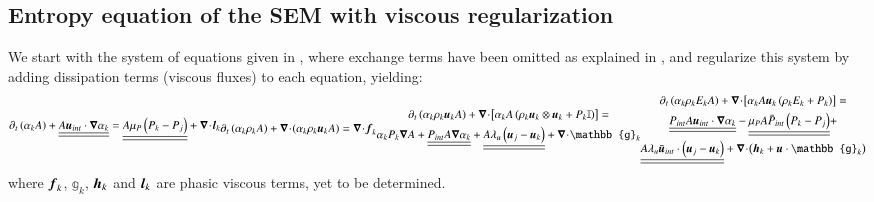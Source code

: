 \documentclass[preprint,10pt]{elsarticle}
\begin{document}
\subsection{Entropy equation of the SEM with viscous regularization}
%
We start with the system of equations given in , where exchange terms have been omitted as explained in ,
and regularize this system by adding dissipation terms (viscous fluxes) to each equation, yielding:
%
\begin{subequations}\label{eq:sev_equ-with-diss-terms}
\begin{align}\label{eq:sev_equ-with-diss-terms-vf}
\partial_t \left( \alpha_k  A\right) + \underline{\underline{A \mbold u_{int} \cdot \grad \alpha_k}} = \underline{\underline{A \mu_P \left( P_k - P_j \right)}} + \div \mbold l_k 
\end{align}
\begin{align}\label{eq:sev_equ-with-diss-terms-cont}
\partial_t \left( \alpha_k \rho_k A \right) + \div \left( \alpha_k \rho_k \mbold u_k A \right) = \div \mbold f_k
\end{align}
%
\begin{multline}\label{eq:sev_equ-with-diss-terms-mom}
\partial_t \left( \alpha_k \rho_k \mbold u_k A \right) + \div \left[ \alpha_k A \left( \rho_k \mbold u_k \otimes \mbold u_k + P_k \mathbb{I} \right) \right] =\\
\alpha_k P_k \grad A + \underline{\underline{P_{int} A \grad \alpha_k}} + \underline{\underline{A \lambda_u \left( \mbold u_j - \mbold u_k \right)}} + \div \mathbb{g}_k
\end{multline}
%
\begin{multline}\label{eq:sev_equ-with-diss-terms-ener}
\partial_t \left( \alpha_k \rho_k E_k A \right) + \div \left[ \alpha_k A \mbold u_k \left( \rho_k E_k + P_k \right) \right] = \\
\underline{\underline{P_{int} A \mbold u_{int} \cdot \grad \alpha_k}} -
\underline{\underline{\mu_P A  \bar{P}_{int} \left( P_k-P_j \right)}} + \\
\underline{\underline{A \lambda_u \bar{\mbold u}_{int} \cdot \left( \mbold u_j - \mbold u_k \right)}}
+ \div \left( \mbold h_k + \mbold u \cdot \mathbb{g}_k \right)
\end{multline}
\end{subequations}
%
where $\boldsymbol f_k$, $\mathbb{g}_k$, $\boldsymbol h_k$ and $\boldsymbol l_k$ are phasic viscous terms, yet to be determined. 
\end{document}
